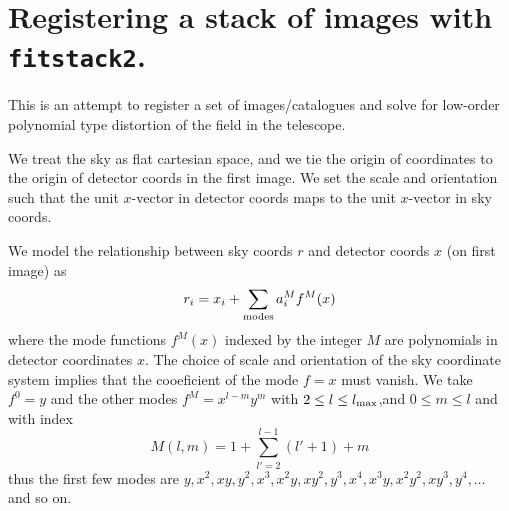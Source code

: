 
\def \beginfig 		{\begin{figure}}
\def \endfig 		{\end{figure}}
\def \figcap		{\caption}

\def \begineq 		{\begin{equation}}
\def \endeq 		{\end{equation}}

\def \max		{{\rm max}}





\section{Registering a stack of images with {\tt fitstack2}.}

This is an attempt to register a set of images/catalogues
and solve for low-order polynomial type distortion of the
field in the telescope.

We treat the sky as flat cartesian space, and we tie the
origin of coordinates to the origin of detector coords in the first
image. We set the scale and orientation such that the unit
$x$-vector in detector coords maps to the unit $x$-vector in sky coords.

We model the relationship between sky coords $r$ and detector coords $x$ (on first
image) as 
\begineq
r_i = x_i + \sum_{\rm modes} a^M_i f^M(x)
\endeq
where the mode functions $f^M(x)$ indexed by the integer $M$ are 
polynomials in detector coordinates $x$.
The choice of scale and orientation of the sky coordinate system implies that   
the cooeficient of the mode $f = x$ must vanish.  We take $f^0 = y$ and
the other modes $f^M = x^{l-m}y^m$ with $2 \le l \le l_\max$,and 
$0 \le m \le l$ and with index
\begineq
M(l,m) = 1 + \sum_{l'=2}^{l - 1} (l'+1) + m
\endeq
thus the first few modes are
$y, x^2, xy, y^2, x^3, x^2 y, x y^2, y^3, x^4, x^3 y, x^2 y^2, x y^3, y^4, \ldots$ 
and so on.

